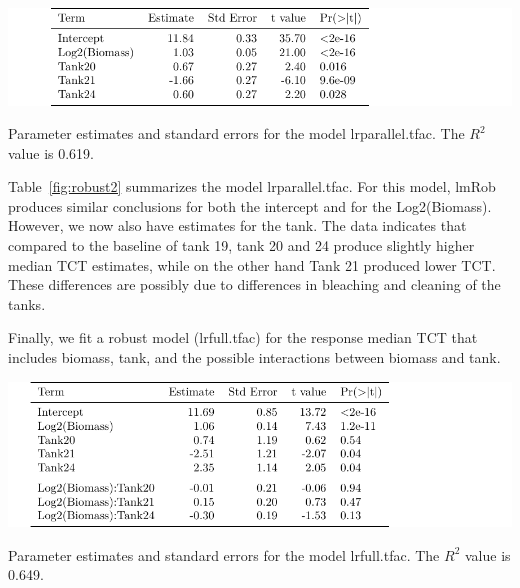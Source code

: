  \vspace{12pt}




\begin{table}[H]
\includegraphics{Chapter3Images/robust2.pdf}
\caption{\hspace{1mm}Parameter estimates and standard errors for the model lrparallel.tfac. The $R^{2}$ value is 0.619.}
\label{fig:robust2}
\end{table}



Table~\ref{fig:robust2} summarizes the model lrparallel.tfac.  For this model, lmRob produces similar conclusions for both the intercept and for the Log2(Biomass).   However, we now also have estimates for the tank. The data indicates that compared to the baseline of tank 19, tank 20 and 24 produce slightly higher median TCT estimates, while on the other hand Tank 21 produced lower TCT. These differences are possibly due to differences in bleaching and cleaning of the tanks.

 \vspace{12pt}

Finally, we fit a robust model (lrfull.tfac) for the response median TCT that includes biomass, tank, and the possible interactions between biomass and tank.

\vspace{12pt}



\begin{table}[H]
\includegraphics{Chapter3Images/robust3.pdf}
\caption{\hspace{1mm}Parameter estimates and standard errors for the model lrfull.tfac. The $R^{2}$ value is 0.649.}
\label{fig:robust3}
\end{table}

 \vspace{12pt}

